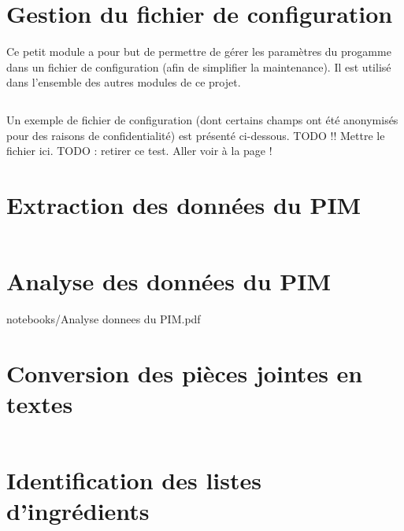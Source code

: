 \documentclass{report}
\begin{document}
        \section{Gestion du fichier de configuration}
        Ce petit module a pour but de permettre de gérer les paramètres du progamme dans un fichier de configuration (afin de simplifier la maintenance).
        Il est utilisé dans l'ensemble des autres modules de ce projet.
        \inputminted[fontsize=\scriptsize]{python}{../src/conf.py}
        Un exemple de fichier de configuration (dont certains champs ont été anonymisés pour des raisons de confidentialité) est présenté ci-dessous.
        TODO !! Mettre le fichier ici.
        TODO : retirer ce test. Aller voir à la page \pageref{lab:zobi} !

        \section{Extraction des données du PIM}
            \inputminted[fontsize=\scriptsize]{python}{../src/pimapi.py}
        
        \section{Analyse des données du PIM}
        
                    {notebooks/Analyse donnees du PIM.pdf}

        \section{Conversion des pièces jointes en textes}
            \inputminted[fontsize=\scriptsize]{python}{../src/pimpdf.py}
        
        \section{Identification des listes d'ingrédients}
            \inputminted[fontsize=\scriptsize]{python}{../src/pimest.py} 
 
\end{document}
